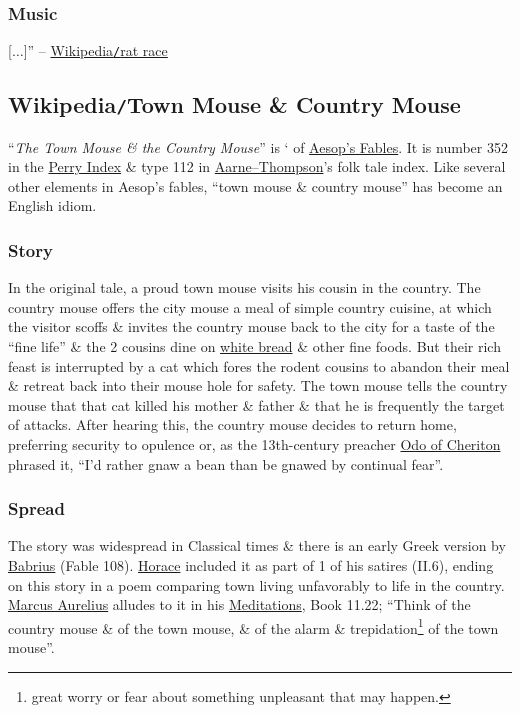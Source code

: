 \documentclass{article}
\begin{document}
\subsubsection{Music}
[$\ldots$]'' -- \href{https://en.wikipedia.org/wiki/Rat_race}{Wikipedia{\tt/}rat race}


\subsection{Wikipedia{\tt/}Town Mouse \& Country Mouse}
``{\it The Town Mouse \& the Country Mouse}'' is ` of \href{https://en.wikipedia.org/wiki/Aesop%27s_Fables}{Aesop's Fables}. It is number 352 in the \href{https://en.wikipedia.org/wiki/Perry_Index}{Perry Index} \& type 112 in \href{https://en.wikipedia.org/wiki/Aarne%E2%80%93Thompson}{Aarne--Thompson}'s folk tale index. Like several other elements in Aesop's fables, ``town mouse \& country mouse'' has become an English idiom.

\subsubsection{Story}
In the original tale, a proud town mouse visits his cousin in the country. The country mouse offers the city mouse a meal of simple country cuisine, at which the visitor scoffs \& invites the country mouse back to the city for a taste of the ``fine life'' \& the 2 cousins dine on \href{https://en.wikipedia.org/wiki/White_bread}{white bread} \& other fine foods. But their rich feast is interrupted by a cat which fores the rodent cousins to abandon their meal \& retreat back into their mouse hole for safety. The town mouse tells the country mouse that that cat killed his mother \& father \& that he is frequently the target of attacks. After hearing this, the country mouse decides to return home, preferring security to opulence or, as the 13th-century preacher \href{https://en.wikipedia.org/wiki/Odo_of_Cheriton}{Odo of Cheriton} phrased it, ``I'd rather gnaw a bean than be gnawed by continual fear''.

\subsubsection{Spread}
The story was widespread in Classical times \& there is an early Greek version by \href{https://en.wikipedia.org/wiki/Babrius}{\sc Babrius} (Fable 108). \href{https://en.wikipedia.org/wiki/Horace}{\sc Horace} included it as part of 1 of his satires (II.6), ending on this story in a poem comparing town living unfavorably to life in the country. \href{https://en.wikipedia.org/wiki/Marcus_Aurelius}{\sc Marcus Aurelius} alludes to it in his \href{https://en.wikipedia.org/wiki/Meditations}{Meditations}, Book 11.22; ``Think of the country mouse \& of the town mouse, \& of the alarm \& trepidation\footnote{great worry or fear about something unpleasant that may happen.} of the town mouse''.
\end{document}
